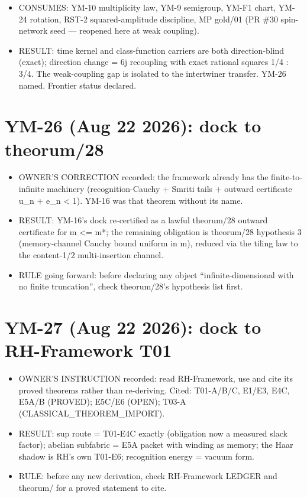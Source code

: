 \begin{itemize}
\tightlist
\item
  CONSUMES: YM-10 multiplicity law, YM-9 semigroup, YM-F1 chart, YM-24
  rotation, RST-2 squared-amplitude discipline, MP gold/01 (PR \#30
  spin-network seed --- reopened here at weak coupling).
\item
  RESULT: time kernel and class-function carriers are both
  direction-blind (exact); direction change = 6j recoupling with exact
  rational squares 1/4 : 3/4. The weak-coupling gap is isolated to the
  intertwiner transfer. YM-26 named. Frontier status declared.
\end{itemize}

\hypertarget{ym-26-aug-22-2026-dock-to-theorum28}{%
\section{YM-26 (Aug 22 2026): dock to theorum/28}\label{ym-26-aug-22-2026-dock-to-theorum28}}

\begin{itemize}
\tightlist
\item
  OWNER'S CORRECTION recorded: the framework already has the finite-to-
  infinite machinery (recognition-Cauchy + Smriti tails + outward
  certificate u\_n + e\_n \textless{} 1). YM-16 was that theorem without its name.
\item
  RESULT: YM-16's dock re-certified as a lawful theorum/28 outward
  certificate for m \textless= m*; the remaining obligation is theorum/28
  hypothesis 3 (memory-channel Cauchy bound uniform in m), reduced via
  the tiling law to the content-1/2 multi-insertion channel.
\item
  RULE going forward: before declaring any object ``infinite-dimensional
  with no finite truncation'', check theorum/28's hypothesis list first.
\end{itemize}

\hypertarget{ym-27-aug-22-2026-dock-to-rh-framework-t01}{%
\section{YM-27 (Aug 22 2026): dock to RH-Framework T01}\label{ym-27-aug-22-2026-dock-to-rh-framework-t01}}

\begin{itemize}
\tightlist
\item
  OWNER'S INSTRUCTION recorded: read RH-Framework, use and cite its
  proved theorems rather than re-deriving. Cited: T01-A/B/C, E1/E3,
  E4C, E5A/B (PROVED); E5C/E6 (OPEN); T03-A (CLASSICAL\_THEOREM\_IMPORT).
\item
  RESULT: sup route = T01-E4C exactly (obligation now a measured slack
  factor); abelian subfabric = E5A packet with winding as memory; the
  Haar shadow is RH's own T01-E6; recognition energy = vacuum form.
\item
  RULE: before any new derivation, check RH-Framework LEDGER and
  theorum/ for a proved statement to cite.
\end{itemize}

